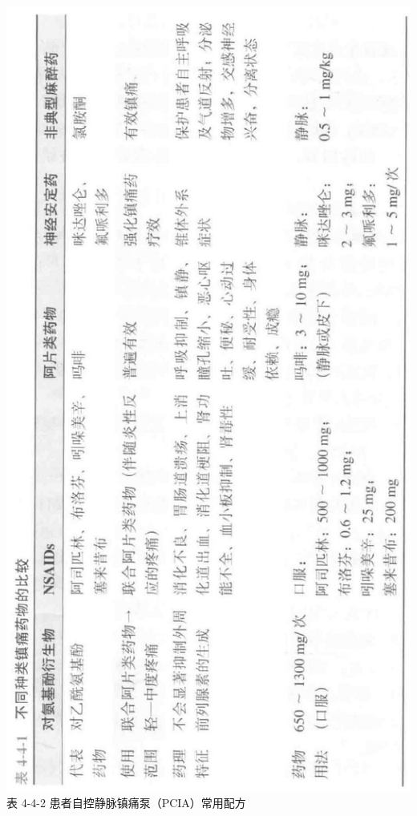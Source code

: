 \documentclass[10pt]{article}
\begin{document}
\includegraphics[max width=\textwidth, center]{2024_07_05_645bb794a4d4f32ee0c8g-276}\\
表 4-4-2 患者自控静脉镇痛泵（PCIA）常用配方
\end{document}
